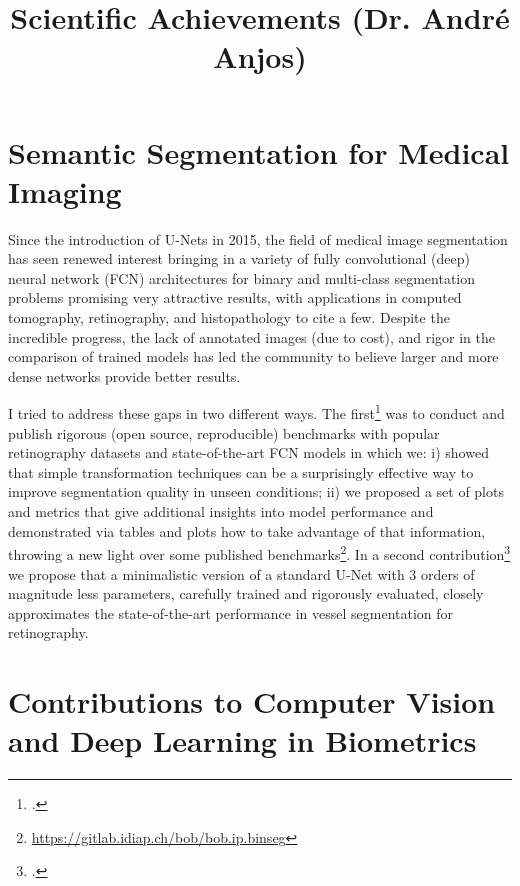 \documentclass[a4paper,10pt,onecolumn]{article}
\author{}
\date{}
\begin{document}

\title{Scientific Achievements (Dr. André Anjos)}
\maketitle

\section{Semantic Segmentation for Medical Imaging}

Since the introduction of U-Nets in 2015, the field of medical image
segmentation has seen renewed interest bringing in a variety of fully
convolutional (deep) neural network (FCN) architectures for binary and
multi-class segmentation problems promising very attractive results, with
applications in computed tomography, retinography, and histopathology to cite a
few.  Despite the incredible progress, the lack of annotated images (due to
cost), and rigor in the comparison of trained models has led the community to
believe larger and more dense networks provide better results.

I tried to address these gaps in two different ways.  The
first\footcite{arxiv-2019} was to conduct and publish rigorous (open source,
reproducible) benchmarks with popular retinography datasets and
state-of-the-art FCN models in which we: i) showed that simple transformation
techniques can be a surprisingly effective way to improve segmentation quality
in unseen conditions; ii) we proposed a set of plots and metrics that give
additional insights into model performance and demonstrated via tables and
plots how to take advantage of that information, throwing a new light over some
published benchmarks\footnote{\url{https://gitlab.idiap.ch/bob/bob.ip.binseg}}.
In a second contribution\footcite{arxiv-2020} we propose that a minimalistic
version of a standard U-Net with 3 orders of magnitude less parameters,
carefully trained and rigorously evaluated, closely approximates the
state-of-the-art performance in vessel segmentation for retinography.

\section{Contributions to Computer Vision and Deep Learning in Biometrics}
\end{document}
